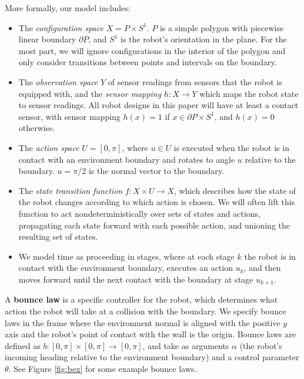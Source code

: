 \documentclass[]{styles/svproc}  %
\begin{document}
More formally, our model includes:

\begin{itemize}
\item The \emph{configuration space} $X = P \times S^1$. $P$ is a simple polygon with 
piecewise linear boundary $\partial P$, and $S^1$ is the robot's orientation in the plane. For the most part, we will ignore configurations in the interior
of the polygon and only consider transitions between points and intervals on the
boundary.
\item The \emph{observation space} $Y$ of sensor readings from sensors that the
robot is equipped with, and the \emph{sensor mapping} $h: X \to Y$ which maps
the robot state to sensor readings. All robot designs in this paper will have at
least a contact sensor, with sensor mapping $h(x) = 1$ if $x \in \partial
P \times S^1$, and $h(x) = 0$ otherwise.
\item The \emph{action space} $U = [0,\pi]$, where $u \in U$ is executed when
the robot is in contact with an environment boundary and rotates to angle $u$
relative to the boundary. $u = \pi/2$ is the normal vector to the boundary.
\item The \emph{state transition function} $f: X \times U \to X$, which
describes how the state of the robot changes according to which action is
chosen. We will often lift this function to act nondeterministically over sets
of states and actions, propagating each state forward with each possible action,
and unioning the resulting set of states.
\item We model time as proceeding in stages, where at each stage $k$ the robot
is in contact with the environment boundary, executes an action $u_k$, and then
moves forward until the next contact with the boundary at stage $u_{k+1}$.
\end{itemize}


\begin{definition}
A \textbf{bounce law} is a specific controller for the robot, which determines
what action the robot will take at a collision with the boundary.
We specify 
bounce laws in the
frame where the environment normal is aligned with the positive $y$ axis and the
robot's point of contact with the wall is the origin.  
Bounce laws are defined as $b: [0,\pi] \times [0,\pi] \to [0,\pi]$, and take as
arguments $\alpha$ (the robot's incoming heading relative to the environment
boundary) and a control parameter $\theta$. See Figure \ref{fig:bex} for some
example bounce laws. 
\end{definition}
\end{document}
